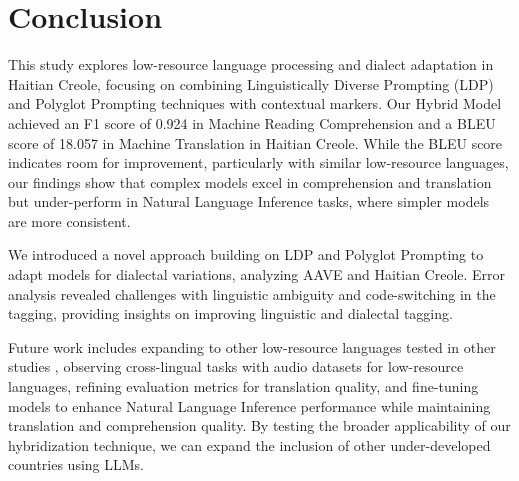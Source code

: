 \section{Conclusion}

This study explores low-resource language processing and dialect adaptation in Haitian Creole, focusing on combining Linguistically Diverse Prompting (LDP) and Polyglot Prompting techniques with contextual markers. Our Hybrid Model achieved an F1 score of 0.924 in Machine Reading Comprehension and a BLEU score of 18.057 in Machine Translation in Haitian Creole. While the BLEU score indicates room for improvement, particularly with similar low-resource languages, our findings show that complex models excel in comprehension and translation but under-perform in Natural Language Inference tasks, where simpler models are more consistent.

We introduced a novel approach building on LDP and Polyglot Prompting to adapt models for dialectal variations, analyzing AAVE and Haitian Creole. Error analysis revealed challenges with linguistic ambiguity and code-switching in the tagging, providing insights on improving linguistic and dialectal tagging.

Future work includes expanding to other low-resource languages tested in other studies \cite{Faisal:24} \cite{Nguyen:24} \cite{Ng:22}, observing cross-lingual tasks with audio datasets for low-resource languages, refining evaluation metrics for translation quality, and fine-tuning models to enhance Natural Language Inference performance while maintaining translation and comprehension quality. By testing the broader applicability of our hybridization technique, we can expand the inclusion of other under-developed countries using LLMs.